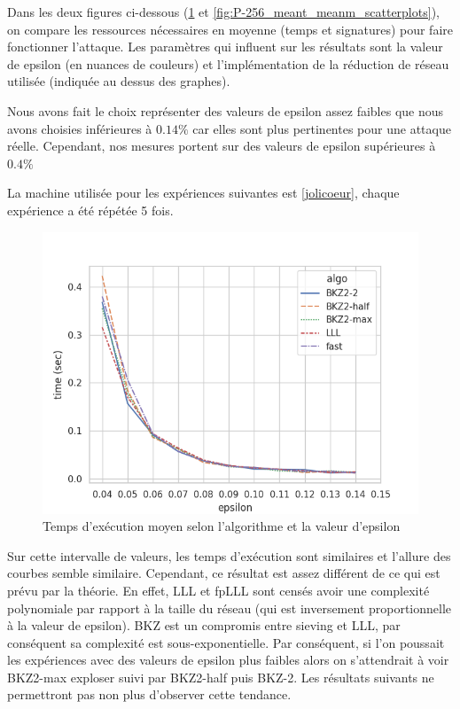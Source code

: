 \documentclass{backend}
\begin{document}
\medbreak

Dans les deux figures ci-dessous (\ref{fig:P-256_meant_meanm_epsi_time} et \ref{fig:P-256_meant_meanm_scatterplots}), on compare les ressources nécessaires en moyenne (temps et signatures) pour faire fonctionner l'attaque. Les paramètres qui influent sur les résultats sont la valeur de epsilon (en nuances de couleurs) et l'implémentation de la réduction de réseau utilisée (indiquée au dessus des graphes).\smallbreak

Nous avons fait le choix représenter des valeurs de epsilon assez faibles que nous avons choisies inférieures à $0.14\%$ car elles sont plus pertinentes pour une attaque réelle. Cependant, nos mesures portent sur des valeurs de epsilon supérieures à $0.4\%$

La machine utilisée pour les expériences suivantes est \ref{jolicoeur}, chaque expérience a été répétée 5 fois.

\begin{figure}[H]
    \centering
    \includegraphics[width=0.75\linewidth]{img/P-256_meant_meanm_epsi_time.png}
    \caption{Temps d'exécution moyen selon l'algorithme et la valeur d'epsilon}
    \label{fig:P-256_meant_meanm_epsi_time}
\end{figure}

Sur cette intervalle de valeurs, les temps d'exécution sont similaires et l'allure des courbes semble similaire.\smallbreak
Cependant, ce résultat est assez différent de ce qui est prévu par la théorie. En effet, LLL et fpLLL sont censés avoir une complexité polynomiale par rapport à la taille du réseau (qui est inversement proportionnelle à la valeur de epsilon).
BKZ est un compromis entre sieving et LLL, par conséquent sa complexité est sous-exponentielle. Par conséquent, si l'on poussait les expériences avec des valeurs de epsilon plus faibles alors on s'attendrait à voir BKZ2-max exploser suivi par BKZ2-half puis BKZ-2. Les résultats suivants ne permettront pas non plus d'observer cette tendance.
\end{document}
